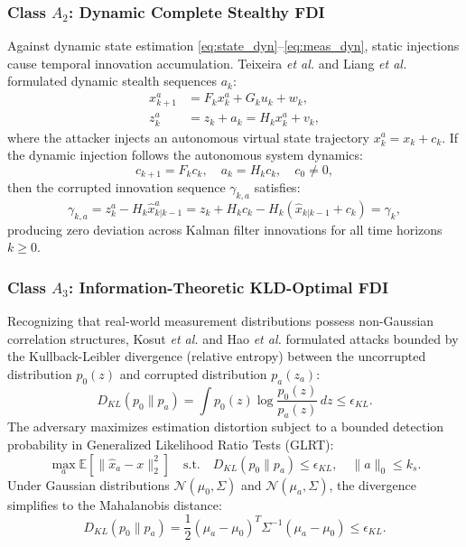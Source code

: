 \documentclass[journal,compsoc]{IEEEtran}
\begin{document}
\subsubsection{Class $A_2$: Dynamic Complete Stealthy FDI \cite{ref19, ref30, ref26, ref33}}
Against dynamic state estimation \eqref{eq:state_dyn}--\eqref{eq:meas_dyn}, static injections cause temporal innovation accumulation. Teixeira \textit{et al.} \cite{ref19} and Liang \textit{et al.} \cite{ref30} formulated dynamic stealth sequences $a_k$:
\begin{align}
    x_{k+1}^a &= F_k x_k^a + G_k u_k + w_k, \\
    z_k^a &= z_k + a_k = H_k x_k^a + v_k,
\end{align}
where the attacker injects an autonomous virtual state trajectory $x_k^a = x_k + c_k$. If the dynamic injection follows the autonomous system dynamics:
\begin{equation}
    c_{k+1} = F_k c_k, \quad a_k = H_k c_k, \quad c_0 \ne 0,
\end{equation}
then the corrupted innovation sequence $\gamma_{k,a}$ satisfies:
\begin{equation}
    \gamma_{k,a} = z_k^a - H_k \hat{x}_{k|k-1}^a = z_k + H_k c_k - H_k (\hat{x}_{k|k-1} + c_k) = \gamma_k,
\end{equation}
producing zero deviation across Kalman filter innovations for all time horizons $k \ge 0$.

\subsubsection{Class $A_3$: Information-Theoretic KLD-Optimal FDI \cite{ref7, ref11, ref63}}
Recognizing that real-world measurement distributions possess non-Gaussian correlation structures, Kosut \textit{et al.} \cite{ref7} and Hao \textit{et al.} \cite{ref11} formulated attacks bounded by the Kullback-Leibler divergence (relative entropy) between the uncorrupted distribution $p_0(z)$ and corrupted distribution $p_a(z_a)$:
\begin{equation}
    D_{KL}(p_0 \parallel p_a) = \int p_0(z) \log \frac{p_0(z)}{p_a(z)} \, dz \le \epsilon_{KL}.
\end{equation}
The adversary maximizes estimation distortion subject to a bounded detection probability in Generalized Likelihood Ratio Tests (GLRT):
\begin{equation}
    \max_{a} \mathbb{E}[\|\hat{x}_a - x\|_2^2] \quad \text{s.t.} \quad D_{KL}(p_0 \parallel p_a) \le \epsilon_{KL}, \quad \|a\|_0 \le k_s.
\end{equation}
Under Gaussian distributions $\mathcal{N}(\mu_0, \Sigma)$ and $\mathcal{N}(\mu_a, \Sigma)$, the divergence simplifies to the Mahalanobis distance:
\begin{equation}
    D_{KL}(p_0 \parallel p_a) = \frac{1}{2} (\mu_a - \mu_0)^T \Sigma^{-1} (\mu_a - \mu_0) \le \epsilon_{KL}.
\end{equation}
\end{document}
